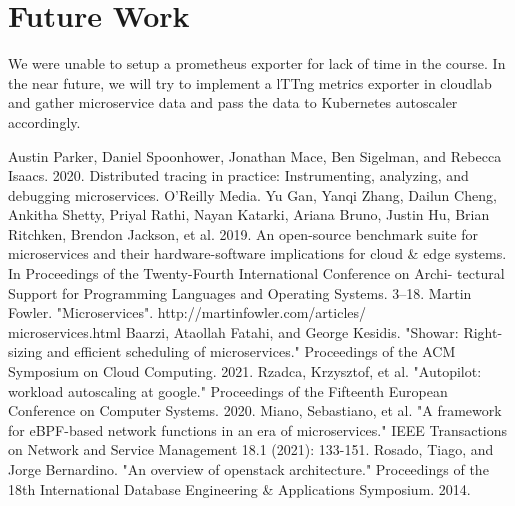 \documentclass[conference]{IEEEtran}
\begin{document}
\section{Future Work}

We were unable to setup a prometheus exporter for lack of time in the course. In the near future, we will try to implement a lTTng metrics exporter in cloudlab and gather microservice data and pass the data to Kubernetes autoscaler accordingly. 


\begin{thebibliography}{00}
     Austin Parker, Daniel Spoonhower, Jonathan Mace, Ben Sigelman, and Rebecca Isaacs. 2020. Distributed tracing in practice: Instrumenting, analyzing, and debugging microservices. O’Reilly Media.
     Yu Gan, Yanqi Zhang, Dailun Cheng, Ankitha Shetty, Priyal Rathi, Nayan Katarki, Ariana Bruno, Justin Hu, Brian Ritchken, Brendon Jackson, et al. 2019. An open-source benchmark suite for microservices and their hardware-software implications for cloud \& edge systems. In Proceedings of the Twenty-Fourth International Conference on Archi- tectural Support for Programming Languages and Operating Systems. 3–18.
     \sloppy Martin Fowler. "Microservices". http://martinfowler.com/articles/\\microservices.html
     Baarzi, Ataollah Fatahi, and George Kesidis. "Showar: Right-sizing and efficient scheduling of microservices." Proceedings of the ACM Symposium on Cloud Computing. 2021.
     Rzadca, Krzysztof, et al. "Autopilot: workload autoscaling at google." Proceedings of the Fifteenth European Conference on Computer Systems. 2020.
     Miano, Sebastiano, et al. "A framework for eBPF-based network functions in an era of microservices." IEEE Transactions on Network and Service Management 18.1 (2021): 133-151.
     Rosado, Tiago, and Jorge Bernardino. "An overview of openstack architecture." Proceedings of the 18th International Database Engineering \& Applications Symposium. 2014.
\end{thebibliography}
\end{document}
